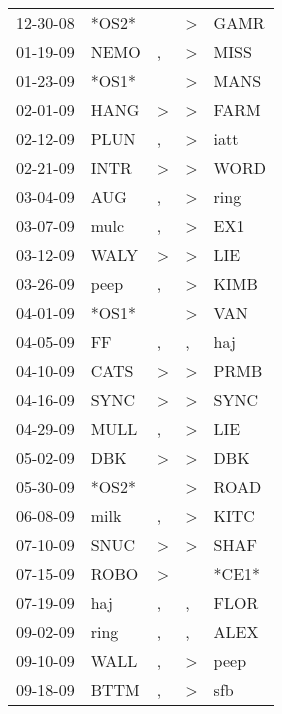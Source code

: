 \begin{supertabular}{lllll}
 12-30-08 &  *OS2* &                  &     \textgreater &   GAMR \\
 01-19-09 &   NEMO &                , &     \textgreater &   MISS \\
 01-23-09 &  *OS1* &                  &     \textgreater &   MANS \\
 02-01-09 &   HANG &     \textgreater &     \textgreater &   FARM \\
 02-12-09 &   PLUN &                , &     \textgreater &   iatt \\
 02-21-09 &   INTR &     \textgreater &     \textgreater &   WORD \\
 03-04-09 &    AUG &                , &     \textgreater &   ring \\
 03-07-09 &   mulc &                , &     \textgreater &    EX1 \\
 03-12-09 &   WALY &     \textgreater &     \textgreater &    LIE \\
 03-26-09 &   peep &                , &     \textgreater &   KIMB \\
 04-01-09 &  *OS1* &                  &     \textgreater &    VAN \\
 04-05-09 &     FF &                , &                , &    haj \\
 04-10-09 &   CATS &     \textgreater &     \textgreater &   PRMB \\
 04-16-09 &   SYNC &     \textgreater &     \textgreater &   SYNC \\
 04-29-09 &   MULL &                , &     \textgreater &    LIE \\
 05-02-09 &    DBK &     \textgreater &     \textgreater &    DBK \\
 05-30-09 &  *OS2* &                  &     \textgreater &   ROAD \\
 06-08-09 &   milk &                , &     \textgreater &   KITC \\
 07-10-09 &   SNUC &     \textgreater &     \textgreater &   SHAF \\
 07-15-09 &   ROBO &     \textgreater &                  &  *CE1* \\
 07-19-09 &    haj &                , &                , &   FLOR \\
 09-02-09 &   ring &                , &                , &   ALEX \\
 09-10-09 &   WALL &                , &     \textgreater &   peep \\
 09-18-09 &   BTTM &                , &     \textgreater &    sfb \\

\end{supertabular}

